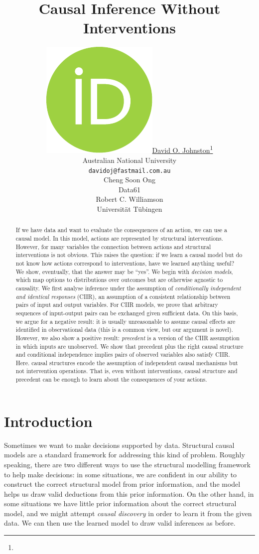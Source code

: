 \documentclass{article}
\author{ \href{https://orcid.org/0000-0003-3122-9767}{\includegraphics[scale=0.06]{orcid.pdf}\hspace{1mm}David O. Johnston}\thanks{} \\
  Australian National University \\
  \texttt{davidoj@fastmail.com.au}\\
  \And
  Cheng Soon Ong \\
  Data61\\
  \And
  Robert C. Williamson \\
  Universität Tübingen \\
}
\begin{document}
 

\title{Causal Inference Without Interventions}

\maketitle

\begin{abstract}
{If we have data and want to evaluate the consequences of an action, we can use a causal model. In this model, actions are represented by structural interventions. However, for many variables the connection between actions and structural interventions is not obvious. This raises the question: if we learn a causal model but do not know how actions correspond to interventions, have we learned anything useful? We show, eventually, that the answer may be ``yes''. We begin with \emph{decision models}, which map options to distributions over outcomes but are otherwise agnostic to causality. We first analyse inference under the assumption of \emph{conditionally independent and identical responses} (CIIR), an assumption of a consistent relationship between pairs of input and output variables. For CIIR models, we prove that arbitrary sequences of input-output pairs can be exchanged given sufficient data. On this basis, we argue for a negative result: it is usually unreasonable to assume causal effects are identified in observational data (this is a common view, but our argument is novel). However, we also show a positive result: \emph{precedent} is a version of the CIIR assumption in which inputs are unobserved. We show that precedent plus the right causal structure and conditional independence implies pairs of observed variables also satisfy CIIR. Here. causal structures encode the assumption of independent causal mechanisms but not intervention operations. That is, even without interventions, causal structure and precedent can be enough to learn about the consequences of your actions.}
\end{abstract}


\section{Introduction}

Sometimes we want to make decisions supported by data. Structural causal models are a standard framework for addressing this kind of problem. Roughly speaking, there are two different ways to use the structural modelling framework to help make decisions: in some situations, we are confident in our ability to construct the correct structural model from prior information, and the model helps us draw valid deductions from this prior information. On the other hand, in some situations we have little prior information about the correct structural model, and we might attempt \emph{causal discovery} in order to learn it from the given data. We can then use the learned model to draw valid inferences as before.
\end{document}
